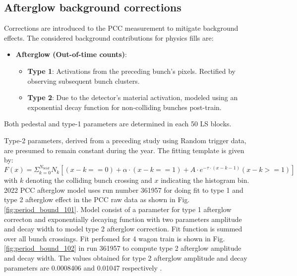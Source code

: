 \subsection{Afterglow background corrections}


Corrections are introduced to the PCC measurement to mitigate background effects. The considered background contributions for physics fills are:

\begin{itemize}
    
    \item \textbf{Afterglow (Out-of-time counts)}:
    \begin{itemize}
        \item \textbf{Type 1}: Activations from the preceding bunch's pixels. Rectified by observing subsequent bunch clusters.
        
        \item \textbf{Type 2}: Due to the detector's material activation, modeled using an exponential decay function for non-colliding bunches post-train.
    \end{itemize}
\end{itemize}

Both pedestal and type-1 parameters are determined in each 50 LS blocks.

Type-2 parameters, derived from a preceding study using Random trigger data, are presumed to remain constant during the year. The fitting template is given by:
\begin{equation}
F(x) = \Sigma_{k=0}^{N_{bcid}} N_k \left[(x-k==0)+\alpha\cdot(x-k==1)+A \cdot e^{-\tau\cdot(x-k-1)}(x-k>=1) \right]
\end{equation}
with $k$ denoting the colliding bunch crossing and $x$ indicating the histogram bin. 2022 PCC afterglow model uses run number 361957 for doing fit to type 1 and type 2 afterglow effect in the PCC raw data as shown in Fig. \ref{fig:period_bound_101}. Model consist of a parameter for type 1 afterglow correcton and exponentially decaying function with two parameters amplitude and decay width to model type 2 afterglow correction. Fit function is summed over all bunch crossings. Fit perfomed for 4 wagon train is shown in Fig.  \ref{fig:period_bound_102} in run 361957 to compute type 2 afterglow amplitude and decay width. The values obtained for type 2 afterglow amplitude and decay parameters are 0.0008406 and 0.01047 respectively \cite{pas_22}. %

